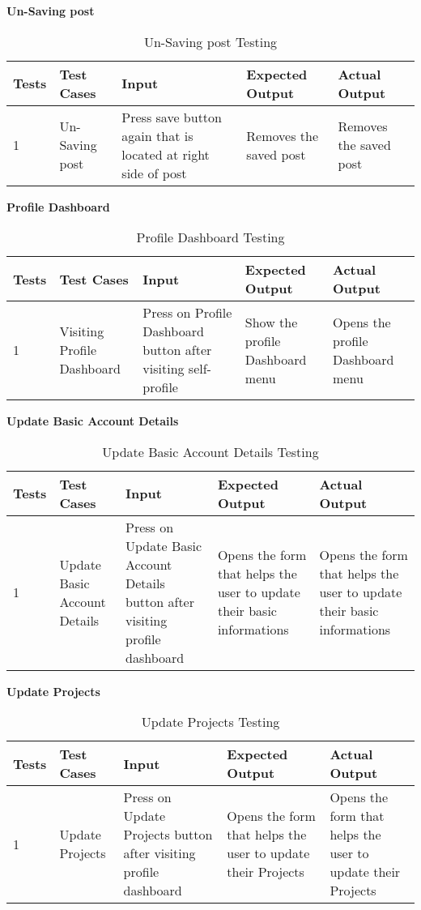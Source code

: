 \textbf{Un-Saving post}\\
\begin{table}[H]
    \caption{Un-Saving post Testing}
        \label{}
    \begin{tabular}{|p{0.3in}|p{1.2in}|p{1.2in}|p{1.2in}|p{1in}|}
        \hline
        Tests & Test Cases & Input &Expected Output & Actual Output \\
        \hline
            1 &Un-Saving post & Press save button again that is located at right side of post & Removes the saved post &  Removes the saved post  \\
            \hline
\end{tabular}
\end{table}

\textbf{Profile Dashboard}\\
\begin{table}[H]
    \caption{Profile Dashboard Testing}
        \label{}
    \begin{tabular}{|p{0.3in}|p{1.2in}|p{1.2in}|p{1.2in}|p{1in}|}
        \hline
        Tests & Test Cases & Input &Expected Output & Actual Output \\
        \hline
            1 &Visiting Profile Dashboard & Press on Profile Dashboard button after visiting self-profile &Show the profile Dashboard menu &Opens the profile Dashboard menu  \\
            \hline
\end{tabular}
\end{table}

\newpage
\textbf{Update Basic Account Details}\\
\begin{table}[H]
    \caption{Update Basic Account Details Testing}
        \label{}
    \begin{tabular}{|p{0.3in}|p{1.2in}|p{1.2in}|p{1.2in}|p{1in}|}
        \hline
        Tests & Test Cases & Input &Expected Output & Actual Output \\
        \hline
            1 &Update Basic Account Details & Press on Update Basic Account Details button after visiting profile dashboard &Opens the form that helps the user to update their basic informations  &Opens the form that helps the user to update their basic informations  \\
            \hline
\end{tabular}
\end{table}

\textbf{Update Projects}\\
\begin{table}[H]
    \caption{Update Projects Testing}
        \label{}
    \begin{tabular}{|p{0.3in}|p{1.2in}|p{1.2in}|p{1.2in}|p{1in}|}
        \hline
        Tests & Test Cases & Input &Expected Output & Actual Output \\
        \hline
            1 &Update Projects & Press on Update Projects button after visiting profile dashboard &Opens the form that helps the user to update their Projects  &Opens the form that helps the user to update their Projects  \\
            \hline
\end{tabular}
\end{table}

